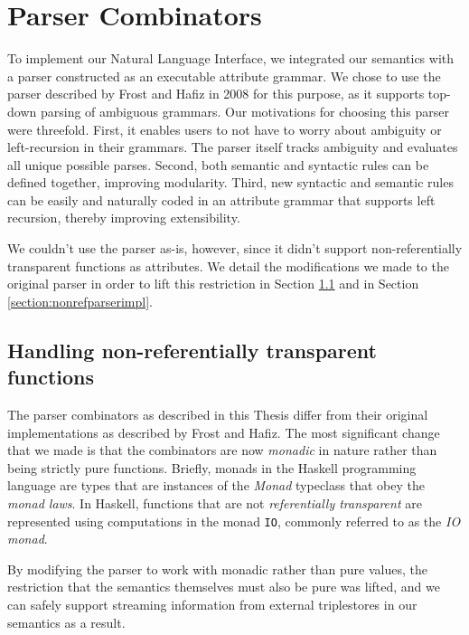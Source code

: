 \documentclass[../main.tex]{subfiles}
\begin{document}
\chapter{Parser Combinators}
\label{chapter:combinators}

To implement our Natural Language Interface, we integrated our semantics with a parser constructed as an executable attribute grammar.  We chose to use the parser
described by Frost and Hafiz in 2008\cite{frosthafiz2008} for this purpose, as it supports top-down parsing of ambiguous grammars.  Our motivations
for choosing this parser were threefold.  First, it enables users to not have to worry about ambiguity or left-recursion in their grammars.  The parser itself
tracks ambiguity and evaluates all unique possible parses\cite{frosthafiz2008}.  Second, both semantic and syntactic rules can be defined together, improving modularity\cite{frosthafiz2008}.
Third, new syntactic and semantic rules can be easily and naturally coded in an attribute grammar that supports left recursion, thereby improving
extensibility\cite{frosthafiz2008}.

We couldn't use the parser
as-is, however, since it didn't support non-referentially transparent functions as attributes.  We detail the modifications we made to the original parser in order to lift this restriction in Section \ref{section:nonrefparser} and in Section \ref{section:nonrefparserimpl}.

\section{Handling non-referentially transparent functions}
\label{section:nonrefparser}

The parser combinators as described in this Thesis differ from their original implementations
as described by Frost and Hafiz\cite{frosthafiz2008}.  The most significant change that we made is that the combinators are now {\em monadic} in nature rather than being strictly pure functions.
Briefly, monads in the Haskell programming language are types that are instances of the {\em Monad} typeclass that obey the
{\em monad laws}\cite{monadlaws}.  In Haskell, functions that are not {\em referentially transparent} are represented using computations in the monad \texttt{IO}, commonly referred to as the {\em IO monad}.

By modifying the parser to work with monadic rather than pure values, the restriction that the semantics themselves must also be pure was lifted, and
we can safely support streaming information from external triplestores in our semantics as a result.
\end{document}
